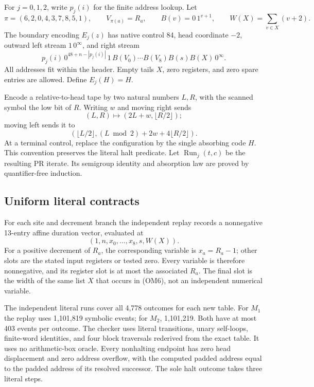 For $j=0,1,2$, write $p_j(i)$ for the finite address lookup.  Let
\[
 \pi=(6,2,0,4,3,7,8,5,1),\qquad V_{\pi(a)}=R_a,
 \qquad B(v)=0\,1^{v+1},\qquad W(X)=\sum_{v\in X}(v+2).
\]
The boundary encoding $E_j(z)$ has native control 84, head coordinate
$-2$, outward left stream $1\,0^\infty$, and right stream
\[
 p_j(i)\,0^{48+n-|p_j(i)|}\,1\,
 B(V_0)\cdots B(V_8)B(s)B(X)\,0^\infty.                 \tag{OM6}
\]
All addresses fit within the header.  Empty tails $X$, zero registers,
and zero spare entries are allowed.  Define $E_j(H)=H$.

Encode a relative-to-head tape by two natural numbers $L,R$, with the
scanned symbol the low bit of $R$.  Writing $w$ and moving right sends
\[
 (L,R)\longmapsto(2L+w,\lfloor R/2\rfloor);
\]
moving left sends it to
\[
 (\lfloor L/2\rfloor,(L\bmod2)+2w+4\lfloor R/2\rfloor).
\]
At a terminal control, replace the configuration by the single absorbing
code $H$.  This convention preserves the literal halt predicate.  Let
$\operatorname{Run}_j(t,c)$ be the resulting PR iterate.  Its semigroup
identity and absorption law are proved by quantifier-free induction.

\subsection{Uniform literal contracts}

For each site and decrement branch the independent replay records a
nonnegative 13-entry affine duration vector, evaluated at
\[
                    (1,n,x_0,\ldots,x_8,s,W(X)).           \tag{OM7}
\]
For a positive decrement of $R_a$, the corresponding variable is
$x_a=R_a-1$; other slots are the stated input registers or tested zero.
Every variable is therefore nonnegative, and its register slot is at most
the associated $R_a$.  The final slot is the width of the same list $X$
that occurs in (OM6), not an independent numerical variable.

The independent literal runs cover all 4,778 outcomes for each new table.
For $M_1$ the replay uses 1,101,819 symbolic events; for $M_2$, 1,101,219.
Both have at most 403 events per outcome.  The checker uses literal
transitions, unary self-loops, finite-word identities, and four block
traversals rederived from the exact table.  It uses no arithmetic-box
oracle.  Every nonhalting endpoint has zero head displacement and zero
address overflow, with the computed padded address equal to the padded
address of its resolved successor.  The sole halt outcome takes three
literal steps.

